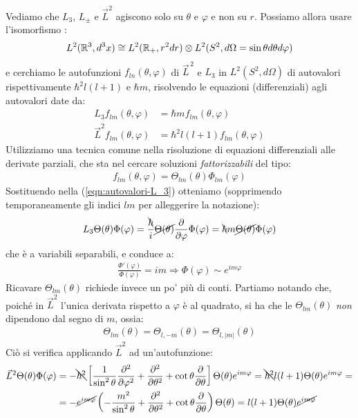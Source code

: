 \documentclass[../../FisicaTeorica.tex]{subfiles}
\begin{document}
Vediamo che $L_3$, $L_\pm$ e $\vec{L}^2$ agiscono solo su $\theta$ e $\varphi$ e non su $r$. Possiamo allora usare l'isomorfismo :
\begin{align*}
L^2(\mathbb{R}^3, d^3x)\cong L^2(\mathbb{R}_+, r^2 dr)\otimes L^2(S^2, d\Omega = \sin\theta d\theta d\varphi)
\end{align*}
e cerchiamo le autofunzioni $f_{ln}(\theta,\varphi)$ di $\vec{L}^{\,2}$ e $L_3$ in $L^2(S^2, d\Omega)$ di autovalori rispettivamente $\hbar^2 l(l+1)$ e $\hbar m$, risolvendo le equazioni (differenziali) agli autovalori date da:
\begin{align}
L_3 f_{lm}(\theta,\varphi) &= \hbar m f_{lm}(\theta,\varphi)\label{eqn:autovalori-L_3}\\
\vec{L}^2 f_{lm}(\theta,\varphi) &= \hbar^2 l(l+1) f_{lm}(\theta,\varphi)\label{eqn:autoalori-Lquadro}
\end{align}
Utilizziamo una tecnica comune nella risoluzione di equazioni differenziali alle derivate parziali, che sta nel cercare soluzioni \textit{fattorizzabili} del tipo:
\begin{align*}
f_{lm}(\theta,\varphi) = \Theta_{lm}(\theta) \Phi_{lm}(\varphi)
\end{align*}
Sostituendo nella (\ref{eqn:autovalori-L_3}) otteniamo (sopprimendo temporaneamente gli indici $lm$ per alleggerire la notazione):
\begin{align*}
L_3 \Theta(\theta)\Phi(\varphi) = \frac{\bcancel{\hbar}}{i}\cancel{\Theta(\theta)}\frac{\partial}{\partial\varphi} \Phi(\varphi)=\bcancel{\hbar} m\cancel{ \Theta(\theta)}\Phi(\varphi)
\end{align*}
che è a variabili separabili, e conduce a:
\begin{align*}
\frac{\Phi'(\varphi)}{\Phi(\varphi)} = im \Rightarrow \Phi(\varphi) \sim e^{im\varphi}
\end{align*}
Ricavare $\Theta_{lm}(\theta)$ richiede invece un po' più di conti. Partiamo notando che, poiché in $\vec{L}^2$ l'unica derivata rispetto a $\varphi$ è al quadrato, si ha che le $\Theta_{lm}(\theta)$ \textit{non} dipendono dal segno di $m$, ossia:
\begin{align*}
\Theta_{lm}(\theta)=\Theta_{l,-m}(\theta)=\Theta_{l,|m|}(\theta)
\end{align*}
Ciò si verifica applicando $\vec{L}^2$ ad un'autofunzione:
\begin{align*}
\vec{L}^2 \Theta(\theta)\Phi(\varphi) &= -\bcancel{\hbar^2}\left[\frac{1}{\sin^2 \theta}\frac{\partial^2}{\partial \varphi^2} + \frac{\partial^2}{\partial \theta^2} + \cot\theta\frac{\partial}{\partial \theta} \right] \Theta(\theta) e^{im\varphi} =\bcancel{ \hbar^2} l(l+1) \Theta(\theta)e^{im\varphi}=\\
&=-\cancel{e^{im\varphi}}\left(-\frac{m^2}{\sin^2 \theta} +\frac{\partial^2}{\partial \theta^2} + \cot\theta \frac{\partial}{\partial \theta} \right)\Theta(\theta)= l(l+1)\Theta(\theta) \cancel{e^{im\varphi}}
\end{align*}
\end{document}
